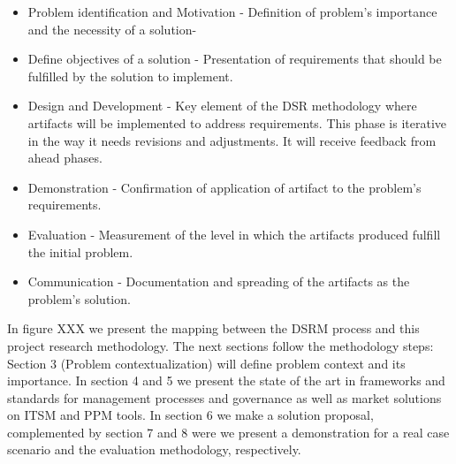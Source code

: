\begin{itemize}
  \item Problem identification and Motivation - Definition of problem's importance and the necessity of a solution-
  \item Define objectives of a solution - Presentation of requirements that should be fulfilled by the solution to implement. 
  \item Design and Development - Key element of the DSR methodology where artifacts will be implemented to address requirements. This phase is iterative in the way it needs revisions and adjustments. It will receive feedback from ahead phases.
  \item Demonstration -  Confirmation of application of artifact to the problem's requirements.
  \item Evaluation - Measurement of the level in which the artifacts produced fulfill the initial problem.
  \item Communication - Documentation and spreading of the artifacts as the problem's solution.
\end{itemize}

In figure XXX we present the mapping between the DSRM process and this project research methodology. The next sections follow the methodology steps: Section 3 (Problem contextualization) will define problem context and its importance. In section 4 and 5 we present the state of the art in frameworks and standards for management processes and governance as well as market solutions on ITSM and PPM tools. In section 6 we make a solution proposal, complemented by section 7 and 8 were we present a demonstration for a real case scenario and the evaluation methodology, respectively. 


